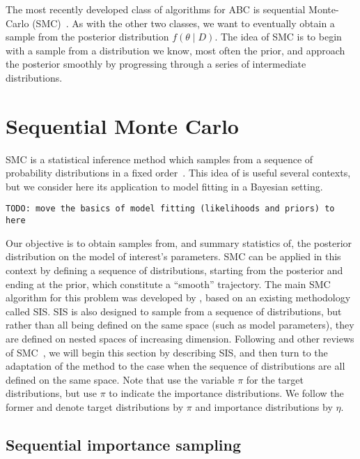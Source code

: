 The most recently developed class of algorithms for ABC is sequential
Monte-Carlo (SMC)~\autocite{sisson2007sequential}. As with the other two
classes, we want to eventually obtain a sample from the posterior distribution
$f(\theta \mid D)$. The idea of SMC is to begin with a sample from a
distribution we know, most often the prior, and approach the posterior smoothly
by progressing through a series of intermediate distributions.

\section{Sequential Monte Carlo}

\Gls{SMC} is a statistical inference method which samples from a sequence of
probability distributions in a fixed order~\autocite{del2006sequential}. This
idea of  is useful several contexts, but we consider
here its application to model fitting in a Bayesian setting. 

\texttt{TODO: move the basics of model fitting (likelihoods and priors) to here}

Our objective is to obtain samples from, and summary statistics of, the
posterior distribution on the model of interest's parameters. \gls{SMC} can be
applied in this context by defining a sequence of distributions, starting from
the posterior and ending at the prior, which constitute a ``smooth''
trajectory. The main \gls{SMC} algorithm for this problem was developed by
\textcite{del2006sequential}, based on an existing methodology called
\gls{SIS}. \gls{SIS} is also designed to sample from a sequence of
distributions, but rather than all being defined on the same space (such as
model parameters), they are defined on nested spaces of increasing dimension.
Following \textcite{del2006sequential} and other reviews of
\gls{SMC}~\autocite{doucet2001introduction}, we will begin this section by
describing \gls{SIS}, and then turn to the adaptation of the method to the case
when the sequence of distributions are all defined on the same space. Note that
\textcite{del2006sequential} use the variable $\pi$ for the target
distributions, but \textcite{doucet2001introduction} use $\pi$ to indicate the
importance distributions. We follow the former and denote target distributions
by $\pi$ and importance distributions by $\eta$.

\subsection{Sequential importance sampling}

